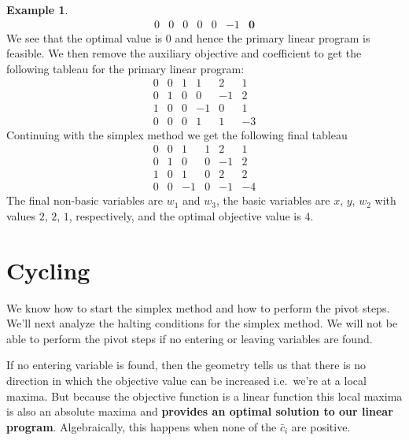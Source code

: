 \documentclass[
]{book}
\theoremstyle{definition}
\theoremstyle{definition}
\newtheorem{example}{Example}[chapter]
\theoremstyle{definition}
\theoremstyle{definition}
\theoremstyle{remark}
\begin{document}
\begin{example}
\begin{equation*}
\begin{array}{rrrrrr|r}
    0 & 0 & 0 & 0 & 0 & -1 & \mathbf{0} 
  \end{array}
\end{equation*}
We see that the optimal value is 0 and hence the primary linear program is feasible. We then remove the auxiliary objective and coefficient to get the following tableau for the primary linear program:
\begin{equation*}
  \begin{array}{rrrrr|r}
    0 & 0 & 1 & \boxed{1} & 2  & 1 \\
    0 & 1 & 0 & 0 & -1 & 2 \\
    1 & 0 & 0 & -1 & 0 & 1 \\ \hline
    0 & 0 & 0 & 1 & 1  & -3
  \end{array}
\end{equation*}
Continuing with the simplex method we get the following final tableau
\begin{equation*}
  \begin{array}{rrrrr|r}
    0 & 0 & 1 & 1 & 2 & 1 \\
    0 & 1 & 0 & 0 & -1 & 2 \\
    1 & 0 & 1 & 0 & 2 & 2 \\ \hline
    0 & 0 & -1 & 0 & -1 & -4 
  \end{array}
\end{equation*}
The final non-basic variables are \(w_1\) and \(w_3\), the basic variables are \(x\), \(y\), \(w_2\) with values \(2\), \(2\), \(1\), respectively, and the optimal objective value is \(4\).
\end{example}

\hypertarget{cycling}{%
\chapter{Cycling}\label{cycling}}

We know how to start the simplex method and how to perform the pivot steps.
We'll next analyze the halting conditions for the simplex method.
We will not be able to perform the pivot steps if no entering or leaving variables are found.

If no entering variable is found, then the geometry tells us that there is no direction in which the objective value can be increased i.e.~we're at a local maxima.
But because the objective function is a linear function this local maxima is also an absolute maxima and \textbf{provides an optimal solution to our linear program}. Algebraically, this happens when none of the \(\bar{c}_i\) are positive.
\end{document}
